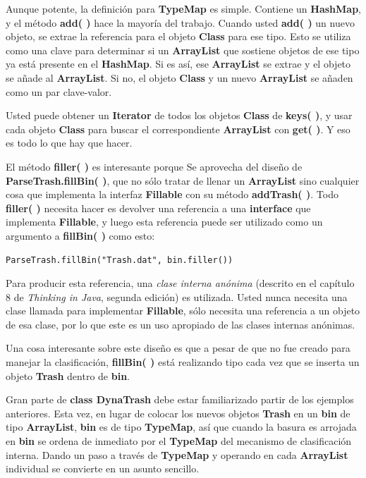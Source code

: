 \documentclass{article}
\begin{document}
Aunque potente, la definición para \textbf{TypeMap} es simple. Contiene un \textbf{HashMap}, y el método \textbf{add( )} hace la mayoría del trabajo. Cuando usted \textbf{add( )} un nuevo objeto, se extrae la referencia para el objeto \textbf{Class} para ese tipo. Esto se utiliza como una clave para determinar si un \textbf{ArrayList} que sostiene objetos de ese tipo ya está presente en el \textbf{HashMap}. Si es así, ese \textbf{ArrayList} se extrae y el objeto se añade al \textbf{ArrayList}. Si no, el objeto \textbf{Class} y un nuevo \textbf{ArrayList} se añaden como un par clave-valor.       \newline

Usted puede obtener un \textbf{Iterator} de todos los objetos \textbf{Class} de   \textbf{keys( )}, y usar cada objeto \textbf{Class} para buscar el correspondiente \textbf{ArrayList} con \textbf{get( )}. Y eso es todo lo que hay que hacer.         \newline

El método \textbf{filler( )} es interesante porque Se aprovecha del diseño de \textbf{ParseTrash.fillBin( )},  que no sólo tratar de llenar un \textbf{ArrayList} sino cualquier cosa que implementa la interfaz \textbf{Fillable} con su método \textbf{addTrash( )}.  Todo \textbf{filler( )} necesita hacer es devolver una referencia a una \textbf{interface} que implementa \textbf{Fillable}, y luego esta referencia puede ser utilizado como un argumento a \textbf{fillBin( )} como esto:    \newline

\begin{lstlisting} 
ParseTrash.fillBin("Trash.dat", bin.filler()) 
\end{lstlisting}

Para producir esta referencia, una \textit{clase interna anónima} (descrito en el capítulo 8 de \textit{Thinking in Java}, segunda edición) es utilizada. Usted nunca necesita una clase llamada para implementar \textbf{Fillable}, sólo necesita una referencia a un objeto de esa clase, por lo que este es un uso apropiado de las clases internas anónimas. \newline

Una cosa interesante sobre este diseño es que a pesar de que no fue creado para manejar la clasificación, \textbf{fillBin( )} está realizando tipo cada vez que se inserta un objeto \textbf{Trash} dentro de \textbf{bin}.        \newline

Gran parte de \textbf{class DynaTrash} debe estar familiarizado partir de los ejemplos anteriores. Esta vez, en lugar de colocar los nuevos objetos \textbf{Trash} en un \textbf{bin} de tipo \textbf{ArrayList}, \textbf{bin} es de tipo \textbf{TypeMap}, así que cuando la basura es arrojada en \textbf{bin} se ordena de inmediato por el \textbf{TypeMap} del mecanismo de clasificación interna. Dando un paso a través de \textbf{TypeMap} y operando en cada \textbf{ArrayList} individual se convierte en un asunto sencillo.  \newline
\end{document}
